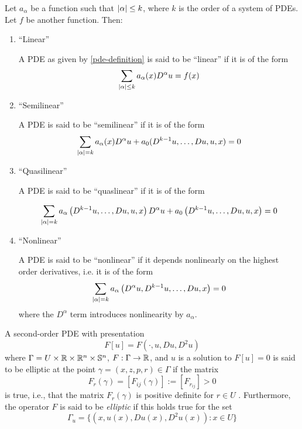\begin{definition}
    Let $a_{\alpha}$ be a function such that $\abs{\alpha} \le k$, where $k$ is the order of a system of PDEs. 
    Let $f$ be another function. Then:
    \begin{enumerate}
        \item ``Linear''
        
        A PDE as given by \eqref{pde-definition} is said to be ``linear'' if it is of the form
        $$\sum_{\abs{\alpha} \le k} a_{\alpha}(x) D^{\alpha} u = f(x)$$
        \item ``Semilinear''
        
        A PDE is said to be ``semilinear'' if it is of the form
        $$\sum_{\abs{\alpha} = k} a_{\alpha}(x) D^{\alpha} u + a_0(D^{k-1}u, \dots, Du, u, x) = 0$$
        \item ``Quasilinear''
        
        A PDE is said to be ``quaslinear'' if it is of the form 

        $$\sum_{\abs{\alpha} = k} a_{\alpha} \left ( D^{k-1} u, \dots, Du, u, x \right ) D^{\alpha} u + a_0 \left ( D^{k-1} u, \dots, Du, u, x \right ) = 0$$
        \item ``Nonlinear''
        
        A PDE is said to be ``nonlinear'' if it depends nonlinearly on the highest 
        order derivatives, i.e. it is of the form
        $$\sum_{\abs{\alpha} = k} a_{\alpha} \left ( D^{\alpha} u, D^{k-1} u, \dots, Du, x \right ) = 0$$  
        where the $D^{\alpha}$ term introduces nonlinearity by $a_{\alpha}$.
    \end{enumerate}
    
\end{definition}

\begin{definition}
    A second-order PDE with presentation
    $$F[u] = F(\cdot, u, Du, D^2 u)$$
    where $\Gamma = U \times \mathbb{R} \times \mathbb{R}^n \times \mathbb{S}^n$, $F:\Gamma \to \mathbb{R}$, and $u$ is a solution to $F[u] = 0$ is said to be elliptic at 
    the point $\gamma = (x,z,p,r) \in \Gamma$ if the matrix
    $$F_{r}(\gamma) = \left [ F_{ij} (\gamma) \right ] := \left [ F_{r_{ij}} \right ] > 0$$ 
    is true, i.e., that the matrix $F_{r}(\gamma)$ is positive definite for $r \in U$ \cite{trudinger-nonlinear-pde-lecture}. 
    Furthermore, the operator $F$ is said to be \textit{elliptic} if this holds true for the set
    $$\Gamma_u = \lbrace (x, u(x), Du(x), D^2 u(x)) : x \in U \rbrace$$
\end{definition}

